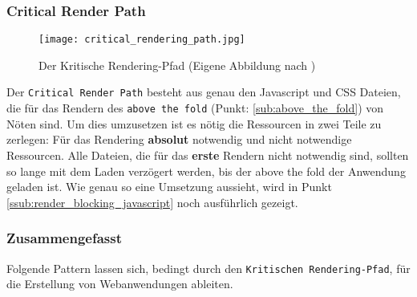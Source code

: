 

		\subsubsection{Critical Render Path} %
		\label{ssub:critical_render_path}
			\begin{figure}[htbp]
				\begin{center}
					\texttt{[image: critical\_rendering\_path.jpg]}
					\caption{Der Kritische Rendering-Pfad (Eigene Abbildung nach \autocite[p. 3]{santana14})}
					\label{fig:critical_rendering_path}
				\end{center}
			\end{figure}
			
			Der \texttt{Critical Render Path} besteht aus genau den Javascript und CSS Dateien, die für das Rendern des \texttt{above the fold} (Punkt: \ref{sub:above_the_fold}) von Nöten sind. Um dies umzusetzen ist es nötig die Ressourcen in zwei Teile zu zerlegen: Für das Rendering \textbf{absolut} notwendig und nicht notwendige Ressourcen. Alle Dateien, die für das \textbf{erste} Rendern nicht notwendig sind, sollten so lange mit dem Laden verzögert werden, bis der above the fold der Anwendung geladen ist. Wie genau so eine Umsetzung aussieht, wird in Punkt \ref{ssub:render_blocking_javascript} noch ausführlich gezeigt.


		\subsubsection{Zusammengefasst} %
		\label{ssub:zusammengefasst_render_path}
		  Folgende Pattern lassen sich, bedingt durch den \texttt{Kritischen Rendering-Pfad}, für die Erstellung von Webanwendungen ableiten.


